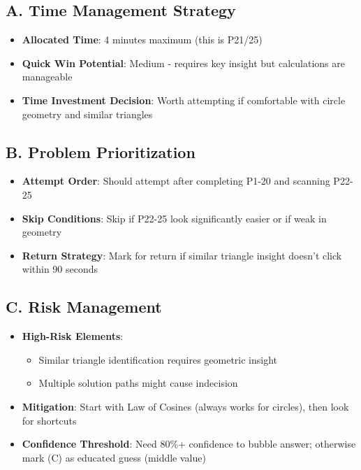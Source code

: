 \documentclass[12pt]{article}
\begin{document}
\begin{competitionbox}
\subsection*{A. Time Management Strategy}
\begin{itemize}[leftmargin=*]
    \item \textbf{Allocated Time}: 4 minutes maximum (this is P21/25)
    \item \textbf{Quick Win Potential}: Medium - requires key insight but calculations are manageable
    \item \textbf{Time Investment Decision}: Worth attempting if comfortable with circle geometry and similar triangles
\end{itemize}

\subsection*{B. Problem Prioritization}
\begin{itemize}[leftmargin=*]
    \item \textbf{Attempt Order}: Should attempt after completing P1-20 and scanning P22-25
    \item \textbf{Skip Conditions}: Skip if P22-25 look significantly easier or if weak in geometry
    \item \textbf{Return Strategy}: Mark for return if similar triangle insight doesn't click within 90 seconds
\end{itemize}

\subsection*{C. Risk Management}
\begin{itemize}[leftmargin=*]
    \item \textbf{High-Risk Elements}: 
    \begin{itemize}
        \item Similar triangle identification requires geometric insight
        \item Multiple solution paths might cause indecision
    \end{itemize}
    \item \textbf{Mitigation}: Start with Law of Cosines (always works for circles), then look for shortcuts
    \item \textbf{Confidence Threshold}: Need 80\%+ confidence to bubble answer; otherwise mark (C) as educated guess (middle value)
\end{itemize}


\end{competitionbox}
\end{document}
